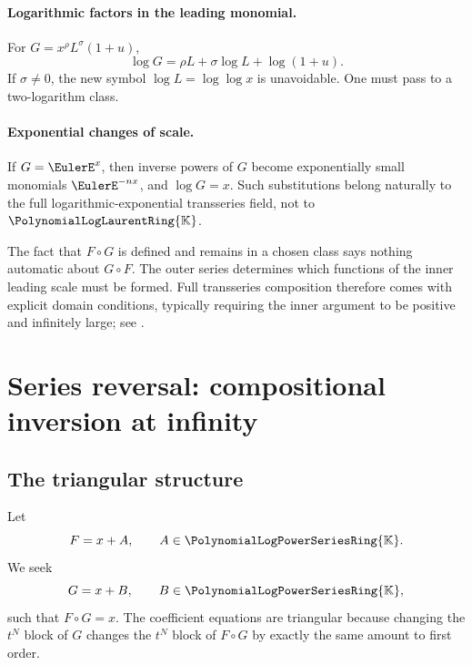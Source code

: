 \documentclass[11pt]{article}
\theoremstyle{pltheorem}
\newcommand{\K}{\mathbb K}
\newcommand{\PL}{\PolynomialLogPowerSeriesRing{\K}}
\newcommand{\PLL}{\PolynomialLogLaurentRing{\K}}
\newcommand{\compose}{\mathbin{\circ}}
\begin{document}
\paragraph{Logarithmic factors in the leading monomial.}
For
\(G=x^\rho L^\sigma(1+u)\),
\begin{equation}\label{eq:log-leading-log-factor}
 \log G=\rho L+\sigma\log L+\log(1+u).
\end{equation}
If \(\sigma\ne0\), the new symbol \(\log L=\log\log x\) is unavoidable.  One must pass to a two-logarithm class.

\paragraph{Exponential changes of scale.}
If \(G=\EulerE^x\), then inverse powers of \(G\) become exponentially small monomials \(\EulerE^{-nx}\), and \(\log G=x\).  Such substitutions belong naturally to the full logarithmic-exponential transseries field, not to \(\PLL\).

\begin{warningbox}
The fact that \(F\compose G\) is defined and remains in a chosen class says nothing automatic about \(G\compose F\).  The outer series determines which functions of the inner leading scale must be formed.  Full transseries composition therefore comes with explicit domain conditions, typically requiring the inner argument to be positive and infinitely large; see \cite{edgar-composition,vanderhoeven-book}.
\end{warningbox}

\section{Series reversal: compositional inversion at infinity}
\label{sec:reversion}

\subsection{The triangular structure}

Let
\begin{equation}\label{eq:F-reversion}
 F=x+A,
 \qquad A\in\PL.
\end{equation}
We seek
\begin{equation}\label{eq:G-reversion}
 G=x+B,
 \qquad B\in\PL,
\end{equation}
such that \(F\compose G=x\).  The coefficient equations are triangular because changing the \(t^N\) block of \(G\) changes the \(t^N\) block of \(F\compose G\) by exactly the same amount to first order.
\end{document}
